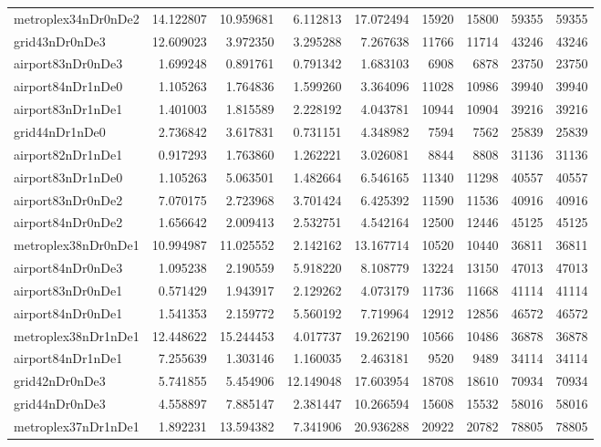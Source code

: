 \begin{longtable}{|l|r|r|r|r|r|r|r|r|}
metroplex34nDr0nDe2 & 14.122807 & 10.959681 & 6.112813 & 17.072494 & 15920 & 15800 & 59355 & 59355 \\
grid43nDr0nDe3 & 12.609023 & 3.972350 & 3.295288 & 7.267638 & 11766 & 11714 & 43246 & 43246 \\
airport83nDr0nDe3 & 1.699248 & 0.891761 & 0.791342 & 1.683103 & 6908 & 6878 & 23750 & 23750 \\
airport84nDr1nDe0 & 1.105263 & 1.764836 & 1.599260 & 3.364096 & 11028 & 10986 & 39940 & 39940 \\
airport83nDr1nDe1 & 1.401003 & 1.815589 & 2.228192 & 4.043781 & 10944 & 10904 & 39216 & 39216 \\
grid44nDr1nDe0 & 2.736842 & 3.617831 & 0.731151 & 4.348982 & 7594 & 7562 & 25839 & 25839 \\
airport82nDr1nDe1 & 0.917293 & 1.763860 & 1.262221 & 3.026081 & 8844 & 8808 & 31136 & 31136 \\
airport83nDr1nDe0 & 1.105263 & 5.063501 & 1.482664 & 6.546165 & 11340 & 11298 & 40557 & 40557 \\
airport83nDr0nDe2 & 7.070175 & 2.723968 & 3.701424 & 6.425392 & 11590 & 11536 & 40916 & 40916 \\
airport84nDr0nDe2 & 1.656642 & 2.009413 & 2.532751 & 4.542164 & 12500 & 12446 & 45125 & 45125 \\
metroplex38nDr0nDe1 & 10.994987 & 11.025552 & 2.142162 & 13.167714 & 10520 & 10440 & 36811 & 36811 \\
airport84nDr0nDe3 & 1.095238 & 2.190559 & 5.918220 & 8.108779 & 13224 & 13150 & 47013 & 47013 \\
airport83nDr0nDe1 & 0.571429 & 1.943917 & 2.129262 & 4.073179 & 11736 & 11668 & 41114 & 41114 \\
airport84nDr0nDe1 & 1.541353 & 2.159772 & 5.560192 & 7.719964 & 12912 & 12856 & 46572 & 46572 \\
metroplex38nDr1nDe1 & 12.448622 & 15.244453 & 4.017737 & 19.262190 & 10566 & 10486 & 36878 & 36878 \\
airport84nDr1nDe1 & 7.255639 & 1.303146 & 1.160035 & 2.463181 & 9520 & 9489 & 34114 & 34114 \\
grid42nDr0nDe3 & 5.741855 & 5.454906 & 12.149048 & 17.603954 & 18708 & 18610 & 70934 & 70934 \\
grid44nDr0nDe3 & 4.558897 & 7.885147 & 2.381447 & 10.266594 & 15608 & 15532 & 58016 & 58016 \\
metroplex37nDr1nDe1 & 1.892231 & 13.594382 & 7.341906 & 20.936288 & 20922 & 20782 & 78805 & 78805 \\

\end{longtable}
